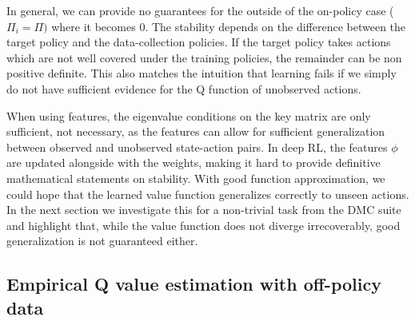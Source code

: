 In general, we can provide no guarantees for the  outside of the on-policy case ($\Pi_i = \Pi)$ where it becomes $0$.
The stability depends on the difference between the target policy and the data-collection policies.
If the target policy takes actions which are not well covered under the training policies, the remainder can be non positive definite.
This also matches the intuition that learning fails if we simply do not have sufficient evidence for the Q function of unobserved actions.

When using features, the eigenvalue conditions on the key matrix are only sufficient, not necessary, as the features can allow for sufficient generalization between observed and unobserved state-action pairs.
In deep RL, the features $\phi$ are updated alongside with the weights, making it hard to provide definitive mathematical statements on stability.
With good function approximation, we could hope that the learned value function generalizes correctly to unseen actions.
In the next section we investigate this for a non-trivial task from the DMC suite and highlight that, while the value function does not diverge irrecoverably, good generalization is not guaranteed either. %

\subsection{Empirical Q value estimation with off-policy data}
\label{sec:off-policy-eval-exp}

